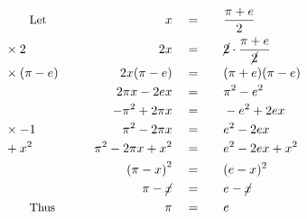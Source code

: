 \begin{alignat*}{5}
&\qquad\small\text{Let}&x\quad&=\quad&&\frac{\pi+e}{2}\\
&\small\times2&2x\quad&=&&\cancel{2}\cdot\frac{\pi+e}{\cancel{2}}\\
&\small\times(\pi-e)\qquad&2x(\pi-e)\quad&=&&(\pi+e)(\pi-e)\\
&\,&2\pi x-2ex\quad&=&&\pi^2-e^2\\
&\,&-\pi^2+2\pi x\quad&=&&-e^2+2ex\\
&\small\times-1&\pi^2-2\pi x\quad&=&&e^2-2ex\\
&\small+x^2&\pi^2-2\pi x+x^2\quad&=&&e^2-2ex+x^2\\
&\,&\left(\pi-x\right)^2\quad&=&&(e-x)^2\\
&\,&\pi-\cancel{x}\quad&=&&e-\cancel{x}\\
&\qquad\small\text{Thus}&\pi\quad&=&&e
\end{alignat*}
